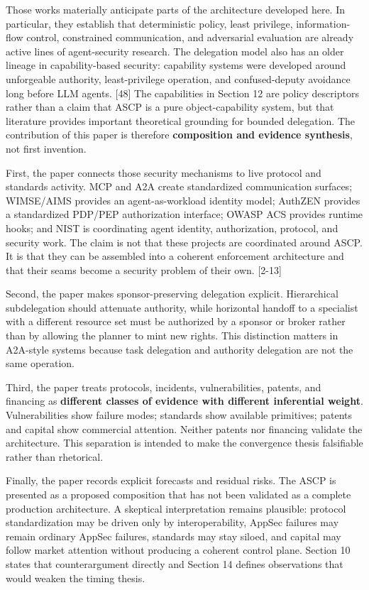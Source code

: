 \documentclass[
  10pt,
  letterpaper,
]{article}
\begin{document}
Those works materially anticipate parts of the architecture developed
here. In particular, they establish that deterministic policy, least
privilege, information-flow control, constrained communication, and
adversarial evaluation are already active lines of agent-security
research. The delegation model also has an older lineage in
capability-based security: capability systems were developed around
unforgeable authority, least-privilege operation, and confused-deputy
avoidance long before LLM agents. {[}48{]} The capabilities in Section
12 are policy descriptors rather than a claim that ASCP is a pure
object-capability system, but that literature provides important
theoretical grounding for bounded delegation. The contribution of this
paper is therefore \textbf{composition and evidence synthesis}, not
first invention.

First, the paper connects those security mechanisms to live protocol and
standards activity. MCP and A2A create standardized communication
surfaces; WIMSE/AIMS provides an agent-as-workload identity model;
AuthZEN provides a standardized PDP/PEP authorization interface; OWASP
ACS provides runtime hooks; and NIST is coordinating agent identity,
authorization, protocol, and security work. The claim is not that these
projects are coordinated around ASCP. It is that they can be assembled
into a coherent enforcement architecture and that their seams become a
security problem of their own. {[}2-13{]}

Second, the paper makes sponsor-preserving delegation explicit.
Hierarchical subdelegation should attenuate authority, while horizontal
handoff to a specialist with a different resource set must be authorized
by a sponsor or broker rather than by allowing the planner to mint new
rights. This distinction matters in A2A-style systems because task
delegation and authority delegation are not the same operation.

Third, the paper treats protocols, incidents, vulnerabilities, patents,
and financing as \textbf{different classes of evidence with different
inferential weight}. Vulnerabilities show failure modes; standards show
available primitives; patents and capital show commercial attention.
Neither patents nor financing validate the architecture. This separation
is intended to make the convergence thesis falsifiable rather than
rhetorical.

Finally, the paper records explicit forecasts and residual risks. The
ASCP is presented as a proposed composition that has not been validated
as a complete production architecture. A skeptical interpretation
remains plausible: protocol standardization may be driven only by
interoperability, AppSec failures may remain ordinary AppSec failures,
standards may stay siloed, and capital may follow market attention
without producing a coherent control plane. Section 10 states that
counterargument directly and Section 14 defines observations that would
weaken the timing thesis.
\end{document}
